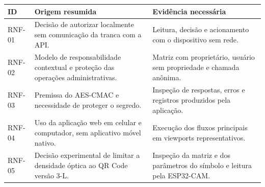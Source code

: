 \begin{quadro}[htb]
    \caption{Rastreabilidade dos requisitos não funcionais}
    \label{qua:rastreabilidade-rnf}
    \small
    \renewcommand{\arraystretch}{1.12}
    \begin{tabular}{|>{\centering\arraybackslash}p{}|>{\raggedright\arraybackslash}p{}|>{\raggedright\arraybackslash}p{}|}
        \hline
        \textbf{ID} & \textbf{Origem resumida} & \textbf{Evidência necessária} \\ \hline
        RNF-01 & Decisão de autorizar localmente sem comunicação da tranca com a API. & Leitura, decisão e acionamento com o dispositivo sem rede. \\ \hline
        RNF-02 & Modelo de responsabilidade contextual e proteção das operações administrativas. & Matriz com proprietário, usuário sem propriedade e chamada anônima. \\ \hline
        RNF-03 & Premissa do AES-CMAC e necessidade de proteger o segredo. & Inspeção de respostas, erros e registros produzidos pela aplicação. \\ \hline
        RNF-04 & Uso da aplicação web em celular e computador, sem aplicativo móvel nativo. & Execução dos fluxos principais em viewports representativos. \\ \hline
        RNF-05 & Decisão experimental de limitar a densidade óptica ao QR Code versão 3-L. & Inspeção da matriz e dos parâmetros do símbolo e leitura pela ESP32-CAM. \\ \hline
    \end{tabular}
\end{quadro}

\clearpage

